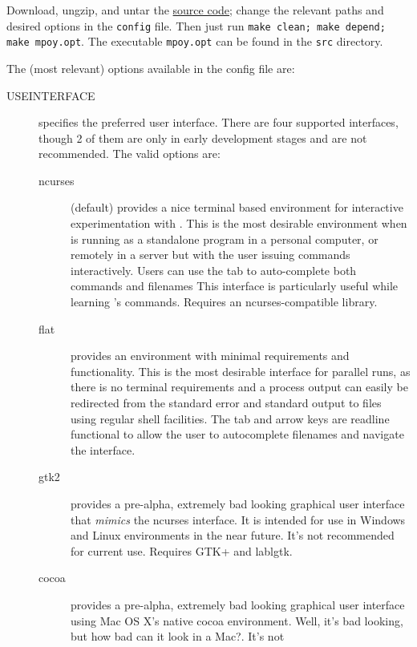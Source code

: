 Download, ungzip, and untar the
\href{http://research.amnh.org/scicomp/projects/poy.php}{\poy source code};
change the relevant paths and desired options in the \texttt{config} file. Then just run \texttt{make clean; make
depend; make mpoy.opt}. The executable \texttt{mpoy.opt} can be found in the \texttt{src}
directory.

The (most relevant) options available in the config file are:
\begin{description}
    \item[USEINTERFACE] specifies the preferred user interface. There are four
        supported interfaces, though 2 of them are only in early development
        stages and are not recommended. The valid options are:
        \begin{description}
            \item[ncurses] (default) provides a nice terminal based environment for
                interactive experimentation with \poy. This is the most desirable
                environment when \poy is running as a standalone program in a
                personal computer, or remotely in a server but with the user
                issuing commands interactively. Users can use the tab to auto-complete both 
                commands and filenames This interface is particularly
                useful while learning \poy's commands. Requires an
                ncurses-compatible library.
            \item[flat] provides an environment with minimal requirements and
                functionality. This is the most desirable interface for parallel
                runs, as there is no terminal requirements and a process output
                can easily be redirected from the standard error and standard
                output to files using regular shell facilities. The tab and arrow keys are readline
                 functional to allow the user to autocomplete filenames and navigate the interface.
            \item[gtk2] provides a pre-alpha, extremely bad looking graphical
                user interface that \emph{mimics} the ncurses interface. It is
                intended for use in Windows and Linux environments in the near
                future. It's not recommended for current use. Requires GTK+ and
                lablgtk.
            \item[cocoa] provides a pre-alpha, extremely bad looking graphical
                user interface using Mac OS X's native cocoa environment. Well,
                it's bad looking, but how bad can it look in a Mac?. It's not

\end{description}
\end{description}
